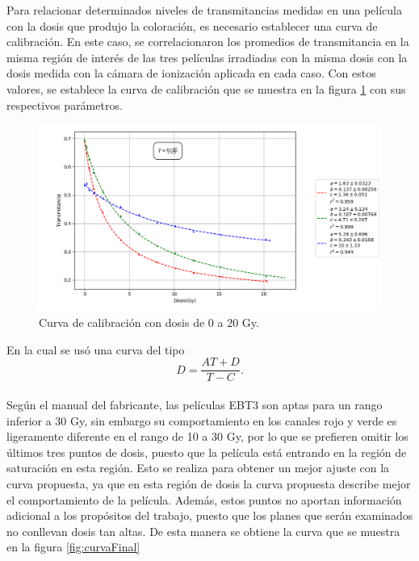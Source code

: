 Para relacionar determinados niveles de transmitancias medidas en una película con la dosis que produjo la coloración, es necesario establecer una curva de calibración. En este caso, se correlacionaron los promedios de transmitancia en la misma región de interés de las tres películas irradiadas con la misma dosis con la dosis medida con la cámara de ionización aplicada en cada caso. Con estos valores, se establece la curva de calibración que se muestra en la figura \ref{fig:curvaFinal20} con sus respectivos parámetros.\\


\begin{figure}[H]
	\centering
\includegraphics[width=\linewidth]{images/calibracionMulti0a20.png}
	
	\caption{Curva de calibración con dosis de 0 a 20 Gy. }
	\label{fig:curvaFinal20}
\end{figure}

En la cual se usó una curva del tipo 
\begin{equation}
D=\frac{AT+D}{T-C}.
\end{equation}\\

Según el manual del fabricante, las películas EBT3 son aptas para un rango inferior a 30 Gy, sin embargo su comportamiento en los canales rojo y verde es ligeramente diferente en el rango de 10 a 30 Gy, por lo que se prefieren omitir los últimos tres puntos de dosis, puesto que la película está entrando en la región de saturación en esta región. Esto se realiza para obtener un mejor ajuste con la curva propuesta, ya que en esta región de dosis la curva propuesta describe mejor el comportamiento de la película.  Además, estos puntos no aportan información adicional a los propósitos del trabajo, puesto que los planes que serán examinados no conllevan dosis tan altas. De esta manera se obtiene la curva que se muestra en la figura \ref{fig:curvaFinal}\\

